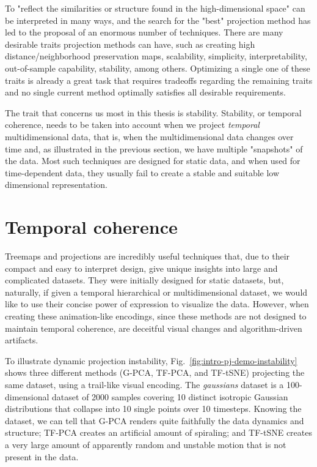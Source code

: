 To "reflect the similarities or structure found in the high-dimensional space" can be interpreted in many ways, and the search for the "best" projection method has led to the proposal of an enormous number of techniques.
There are many desirable traits projection methods can have, such as creating high distance/neighborhood preservation maps, scalability, simplicity, interpretability, out-of-sample capability, stability, among others. 
Optimizing a single one of these traits is already a great task that requires tradeoffs regarding the remaining traits and no single current method optimally satisfies all desirable requirements.

The trait that concerns us most in this thesis is stability. Stability, or temporal coherence, needs to be taken into account when we project \emph{temporal} multidimensional data, that is, when the multidimensional data changes over time and, as illustrated in the previous section, we have multiple "snapshots" of the data. 
Most such techniques are designed for static data, and when used for time-dependent data, they usually fail to create a stable and suitable low dimensional representation.

\section{Temporal coherence}

Treemaps and projections are incredibly useful techniques that, due to their compact and easy to interpret design, give unique insights into large and complicated datasets.
They were initially designed for static datasets, but, naturally, if given a temporal hierarchical or multidimensional dataset, we would like to use their concise power of expression to visualize the data. However, when creating these animation-like encodings, since these methods are not designed to maintain temporal coherence, are deceitful visual changes and algorithm-driven artifacts.

To illustrate dynamic projection instability, Fig.~\ref{fig:intro-pj-demo-instability} shows three different methods (G-PCA, TF-PCA, and TF-tSNE) projecting the same dataset, using a trail-like visual encoding. The \emph{gaussians} dataset is a 100-dimensional dataset of 2000 samples covering 10 distinct isotropic Gaussian distributions that collapse into 10 single points over 10 timesteps. Knowing the dataset, we can tell that G-PCA renders quite faithfully the data dynamics and structure; TF-PCA creates an artificial amount of spiraling; and TF-tSNE creates a very large amount of apparently random and unstable motion that is not present in the data.  


